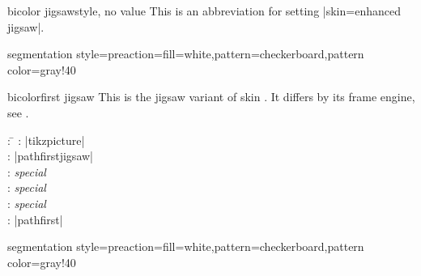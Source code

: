 \begin{docTcbKey}{bicolor jigsaw}{}{style, no value}
  This is an abbreviation for setting |skin=enhanced jigsaw|.
\end{docTcbKey}


\begin{dispExample*}{segmentation style={preaction={fill=white},pattern=checkerboard,pattern color=gray!40}}
\end{dispExample*}


\clearpage


\begin{docSkin}[doc new=2021-05-21]{bicolorfirst jigsaw}
  This is the jigsaw variant of skin .
  It differs by its frame engine, see .
\begin{tcolorbox}[skintable=bicolorfirst jigsaw]
  \begin{tabbing}
    : \=\kill
    :  \> |tikzpicture|\\ 
    :           \> |pathfirstjigsaw|\\
    : \> \emph{special}\\ 
    :        \> \emph{special}\\
    :    \> \emph{special}\\
    :           \> |pathfirst|
  \end{tabbing}
\end{tcolorbox}
\end{docSkin}

\begin{dispExample*}{segmentation style={preaction={fill=white},pattern=checkerboard,pattern color=gray!40}}
\end{dispExample*}



\clearpage

